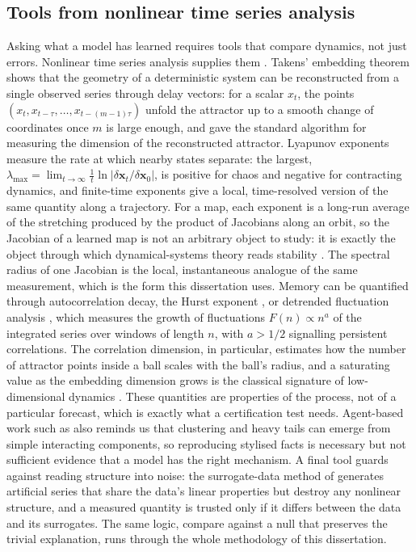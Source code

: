 \documentclass[12pt,a4paper]{article}
\begin{document}
\subsection{Tools from nonlinear time series analysis}

Asking what a model has learned requires tools that compare dynamics, not
just errors. Nonlinear time series analysis supplies them
\citep{kantzschreiber2004}. Takens' embedding theorem
\citep{takens1981} shows that the geometry of a deterministic system can
be reconstructed from a single observed series through delay vectors:
for a scalar $x_t$, the points $(x_t, x_{t-\tau}, \dots,
x_{t-(m-1)\tau})$ unfold the attractor up to a smooth change of
coordinates once $m$ is large enough, and
\citet{grassberger1983} gave the standard algorithm for measuring the
dimension of the reconstructed attractor. Lyapunov exponents measure the
rate at which nearby states separate: the largest,
$\lambda_{\max} = \lim_{t \to \infty} \frac{1}{t} \ln |\delta\mathbf{x}_t
/ \delta\mathbf{x}_0|$, is positive for chaos and negative for
contracting dynamics, and finite-time exponents give a local,
time-resolved version of the same quantity along a trajectory. For a
map, each exponent is a long-run average of the stretching produced by
the product of Jacobians along an orbit, so the Jacobian of a learned
map is not an arbitrary object to study: it is exactly the object
through which dynamical-systems theory reads stability
\citep{kantzschreiber2004}. The spectral radius of one Jacobian is the
local, instantaneous analogue of the same measurement, which is the form
this dissertation uses. Memory can be quantified
through autocorrelation decay, the Hurst exponent \citep{hurst1951}, or
detrended fluctuation analysis \citep{peng1994}, which measures the
growth of fluctuations $F(n) \propto n^{a}$ of the integrated series
over windows of length $n$, with $a > 1/2$ signalling persistent
correlations. The correlation dimension, in particular,
estimates how the number of attractor points inside a ball scales with
the ball's radius, and a saturating value as the embedding dimension
grows is the classical signature of low-dimensional dynamics
\citep{grassberger1983,kantzschreiber2004}. These quantities are
properties of the process, not of a particular forecast, which is exactly
what a certification test needs. Agent-based work such as
\citet{luxmarchesi1999} also reminds us that clustering and heavy tails
can emerge from simple interacting components, so reproducing stylised
facts is necessary but not sufficient evidence that a model has the right
mechanism. A final tool guards against reading structure into noise:
the surrogate-data method of \citet{theiler1992} generates artificial
series that share the data's linear properties but destroy any
nonlinear structure, and a measured quantity is trusted only if it
differs between the data and its surrogates. The same logic, compare
against a null that preserves the trivial explanation, runs through the
whole methodology of this dissertation.
\end{document}
